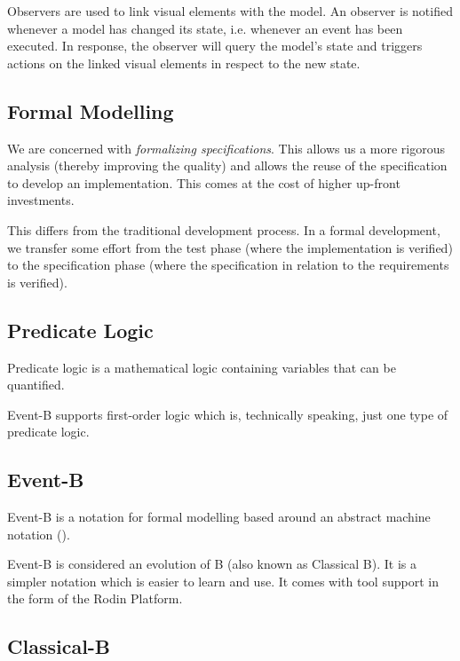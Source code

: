\documentclass[twoside,10pt]{book}
\begin{document}
Observers are used to link visual elements with the model. 
An observer is notified whenever a model has changed its state, i.e. whenever an event has been executed. 
In response, the observer will query the model's state and triggers actions on the linked visual elements in respect to the new state. 

\subsection{Formal Modelling}

We are concerned with \textit{formalizing specifications}.  This allows us a more rigorous analysis (thereby improving the quality) and allows the reuse of the specification to develop an implementation.  This comes at the cost of higher up-front investments.

This differs from the traditional development process. In a formal development, we transfer some effort from the test phase (where the implementation is verified) to the specification phase (where the specification in relation to the requirements is verified).

\subsection{Predicate Logic}
\label{predicate_logic}

Predicate logic is a mathematical logic containing variables that can be quantified.

Event-B supports first-order logic which is, technically speaking, just one type of predicate logic.  

\subsection{Event-B}
\label{eventb}

Event-B is a notation for formal modelling based around an abstract machine notation ().

Event-B is considered an evolution of B (also known as Classical B). It is a simpler notation which is easier to learn and use. It comes with tool support in the form of the Rodin Platform.

\subsection{Classical-B}
\label{classicalb}
\end{document}
